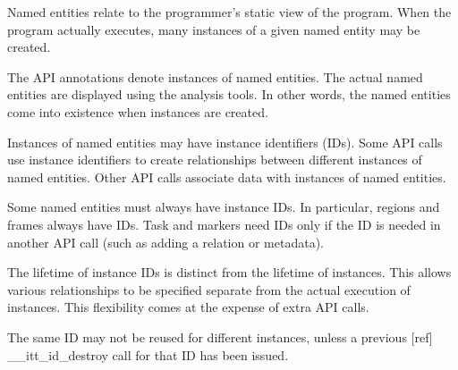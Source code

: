 Named entities relate to the programmer's static view of the program. When the program actually executes, many instances of a given named entity may be created.

The A\-P\-I annotations denote instances of named entities. The actual named entities are displayed using the analysis tools. In other words, the named entities come into existence when instances are created.

Instances of named entities may have instance identifiers (I\-Ds). Some A\-P\-I calls use instance identifiers to create relationships between different instances of named entities. Other A\-P\-I calls associate data with instances of named entities.

Some named entities must always have instance I\-Ds. In particular, regions and frames always have I\-Ds. Task and markers need I\-Ds only if the I\-D is needed in another A\-P\-I call (such as adding a relation or metadata).

The lifetime of instance I\-Ds is distinct from the lifetime of instances. This allows various relationships to be specified separate from the actual execution of instances. This flexibility comes at the expense of extra A\-P\-I calls.

The same I\-D may not be reused for different instances, unless a previous \mbox{[}ref\mbox{]} \-\_\-\-\_\-itt\-\_\-id\-\_\-destroy call for that I\-D has been issued. 